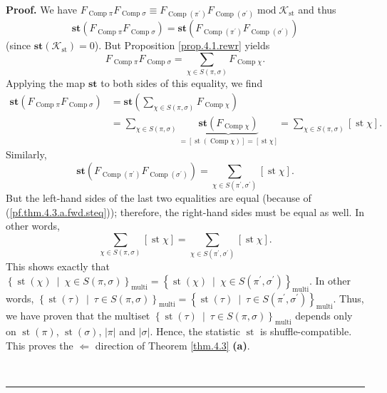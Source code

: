 \documentclass[numbers=enddot,12pt,final,onecolumn,notitlepage]{scrartcl}%
\theoremstyle{definition}
\newenvironment{proof}[1][Proof]{\noindent\textbf{#1.} }{\ \rule{0.5em}{0.5em}}
\newenvironment{verlong}{}{}
\let\sumnonlimits\sum
\renewcommand{\sum}{\sumnonlimits\limits}
\begin{document}
\begin{verlong}
\begin{proof}
We have $F_{\operatorname*{Comp}\pi}F_{\operatorname*{Comp}\sigma}\equiv
F_{\operatorname*{Comp}\left(  \pi^{\prime}\right)  }F_{\operatorname*{Comp}%
\left(  \sigma^{\prime}\right)  }\operatorname{mod}\mathcal{K}%
_{\operatorname*{st}}$ and thus%
\begin{equation}
\mathbf{st}\left(  F_{\operatorname*{Comp}\pi}F_{\operatorname*{Comp}\sigma
}\right)  =\mathbf{st}\left(  F_{\operatorname*{Comp}\left(  \pi^{\prime
}\right)  }F_{\operatorname*{Comp}\left(  \sigma^{\prime}\right)  }\right)
\label{pf.thm.4.3.a.fwd.steq}%
\end{equation}
(since $\mathbf{st}\left(  \mathcal{K}_{\operatorname*{st}}\right)  =0$). But
Proposition \ref{prop.4.1.rewr} yields%
\[
F_{\operatorname*{Comp}\pi}F_{\operatorname*{Comp}\sigma}=\sum_{\chi\in
S\left(  \pi,\sigma\right)  }F_{\operatorname*{Comp}\chi}.
\]
Applying the map $\mathbf{st}$ to both sides of this equality, we find%
\begin{align*}
\mathbf{st}\left(  F_{\operatorname*{Comp}\pi}F_{\operatorname*{Comp}\sigma
}\right)   &  =\mathbf{st}\left(  \sum_{\chi\in S\left(  \pi,\sigma\right)
}F_{\operatorname*{Comp}\chi}\right) \\
&  =\sum_{\chi\in S\left(  \pi,\sigma\right)  }\underbrace{\mathbf{st}\left(
F_{\operatorname*{Comp}\chi}\right)  }_{=\left[  \operatorname*{st}\left(
\operatorname*{Comp}\chi\right)  \right]  =\left[  \operatorname*{st}%
\chi\right]  }=\sum_{\chi\in S\left(  \pi,\sigma\right)  }\left[
\operatorname*{st}\chi\right]  .
\end{align*}
Similarly,%
\[
\mathbf{st}\left(  F_{\operatorname*{Comp}\left(  \pi^{\prime}\right)
}F_{\operatorname*{Comp}\left(  \sigma^{\prime}\right)  }\right)  =\sum
_{\chi\in S\left(  \pi^{\prime},\sigma^{\prime}\right)  }\left[
\operatorname*{st}\chi\right]  .
\]
But the left-hand sides of the last two equalities are equal (because of
(\ref{pf.thm.4.3.a.fwd.steq})); therefore, the right-hand sides must be equal
as well. In other words,
\[
\sum_{\chi\in S\left(  \pi,\sigma\right)  }\left[  \operatorname*{st}%
\chi\right]  =\sum_{\chi\in S\left(  \pi^{\prime},\sigma^{\prime}\right)
}\left[  \operatorname*{st}\chi\right]  .
\]
This shows exactly that $\left\{  \operatorname*{st}\left(  \chi\right)
\ \mid\ \chi\in S\left(  \pi,\sigma\right)  \right\}  _{\operatorname*{multi}}
=\left\{  \operatorname*{st}\left(  \chi\right)  \ \mid\ \chi\in S\left(
\pi^{\prime},\sigma^{\prime}\right)  \right\}  _{\operatorname*{multi}} $. In
other words, $\left\{  \operatorname*{st}\left(  \tau\right)  \ \mid\ \tau\in
S\left(  \pi,\sigma\right)  \right\}  _{\operatorname*{multi}} =\left\{
\operatorname*{st}\left(  \tau\right)  \ \mid\ \tau\in S\left(  \pi^{\prime
},\sigma^{\prime}\right)  \right\}  _{\operatorname*{multi}} $. Thus, we have
proven that the multiset $\left\{  \operatorname*{st}\left(  \tau\right)
\ \mid\ \tau\in S\left(  \pi,\sigma\right)  \right\}  _{\operatorname*{multi}}
$ depends only on $\operatorname*{st}\left(  \pi\right)  $,
$\operatorname*{st}\left(  \sigma\right)  $, $\left\vert \pi\right\vert $ and
$\left\vert \sigma\right\vert $. Hence, the statistic $\operatorname*{st}$ is
shuffle-compatible. This proves the $\Longleftarrow$ direction of Theorem
\ref{thm.4.3} \textbf{(a)}.


\end{proof}
\end{verlong}
\end{document}
